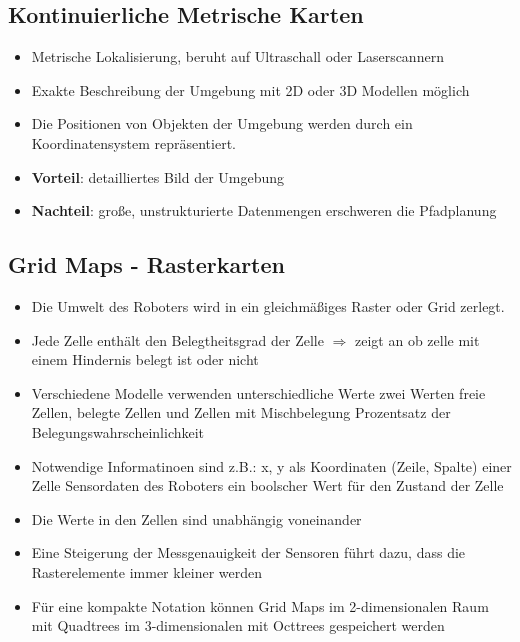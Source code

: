 \subsection{Kontinuierliche Metrische Karten}
\begin{itemize}
	\item Metrische Lokalisierung, beruht auf Ultraschall oder Laserscannern
	\item Exakte Beschreibung der Umgebung mit 2D oder 3D Modellen möglich
	\item Die Positionen von Objekten der Umgebung werden durch ein Koordinatensystem repräsentiert.
	\item \textbf{Vorteil}: detailliertes Bild der Umgebung
	\item \textbf{Nachteil}: große, unstrukturierte Datenmengen erschweren die Pfadplanung
\end{itemize}
\subsection{Grid Maps - Rasterkarten}
\begin{itemize}
	\item Die Umwelt des Roboters wird in ein gleichmäßiges Raster oder Grid zerlegt.
	\item Jede Zelle enthält den Belegtheitsgrad der Zelle $\Rightarrow$ zeigt an ob zelle mit einem Hindernis belegt ist oder nicht
	\item Verschiedene Modelle verwenden unterschiedliche Werte
	\subitem zwei Werten
	\subitem freie Zellen, belegte Zellen und Zellen mit Mischbelegung
	\subitem Prozentsatz der Belegungswahrscheinlichkeit
	\item Notwendige Informatinoen sind z.B.:
	\subitem x, y als Koordinaten (Zeile, Spalte) einer Zelle
	\subitem Sensordaten des Roboters
	\subitem ein boolscher Wert für den Zustand der Zelle
	\item Die Werte in den Zellen sind unabhängig voneinander
	\item Eine Steigerung der Messgenauigkeit der Sensoren führt dazu, dass die Rasterelemente immer kleiner werden
	\item Für eine kompakte Notation können Grid Maps im 2-dimensionalen Raum mit Quadtrees im 3-dimensionalen mit Octtrees gespeichert werden
\end{itemize}
